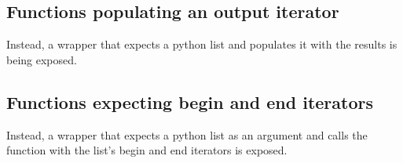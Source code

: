 \subsection{Functions populating an output iterator}
\label{sec:code:fnc-out}
Instead, a wrapper that expects a python list and populates it with
the results is being exposed.

\subsection{Functions expecting begin and end iterators}
\label{sec:code:fnc-range}
Instead, a wrapper that expects a python list as an argument and calls
the function with the list's begin and end iterators is exposed.
